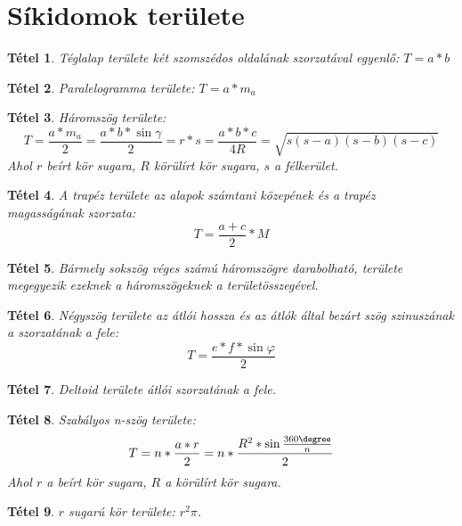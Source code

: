 \documentclass[twoside,12pt]{report}
\newtheorem{theorem}{Tétel}[section]
\theoremstyle{definition}
\begin{document}
\section{Síkidomok területe}
	\begin{theorem}
		Téglalap területe két szomszédos oldalának szorzatával egyenlő: $T=a*b$
	\end{theorem}
	\begin{theorem}
		Paralelogramma területe: $T=a*m_a$
	\end{theorem}
	\begin{theorem}
		Háromszög területe: 
		\begin{equation*}
		T=\frac{a*m_a}{2}=\frac{a*b*\sin\gamma}{2}=r*s=\frac{a*b*c}{4R}=\sqrt{s(s-a)(s-b)(s-c)}
		\end{equation*}
		Ahol $r$ beírt kör sugara, $R$ körülírt kör sugara, $s$ a félkerület.
	\end{theorem}
	\begin{theorem}
		A trapéz területe az alapok számtani közepének és a trapéz magasságának szorzata:
		\begin{equation*}
			T=\frac{a+c}{2}*M
		\end{equation*}
	\end{theorem}
	\begin{theorem}
		Bármely sokszög véges számú háromszögre darabolható, területe megegyezik ezeknek a háromszögeknek a területösszegével.
	\end{theorem}
	\begin{theorem}
		Négyszög területe az átlói hossza és az átlók által bezárt szög szinuszának a szorzatának a fele:
		\begin{equation*}
			T=\frac{e*f*\sin\varphi}{2}
		\end{equation*}
	\end{theorem}
	\begin{theorem}
		Deltoid területe átlói szorzatának a fele.
	\end{theorem}
	\begin{theorem}
		Szabályos n-szög területe:
		\begin{equation*}
			T=n*\frac{a*r}{2}=n*\frac{R^2*\sin\frac{360\degree}{n}}{2}
		\end{equation*}
		Ahol $r$ a beírt kör sugara, $R$ a körülírt kör sugara.
	\end{theorem}
	\begin{theorem}
		$r$ sugarú kör területe: $r^2\pi$.
	\end{theorem}
\end{document}
